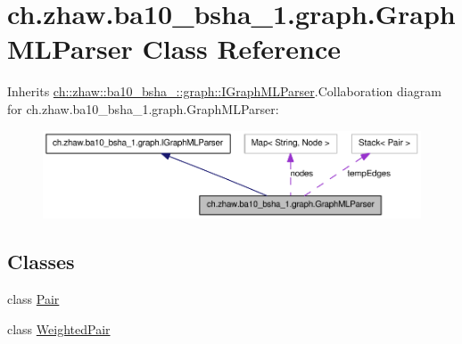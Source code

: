 \hypertarget{classch_1_1zhaw_1_1ba10__bsha__1_1_1graph_1_1GraphMLParser}{
\section{ch.zhaw.ba10\_\-bsha\_\-1.graph.GraphMLParser Class Reference}
\label{classch_1_1zhaw_1_1ba10__bsha__1_1_1graph_1_1GraphMLParser}
}


Inherits \hyperlink{interfacech_1_1zhaw_1_1ba10__bsha__1_1_1graph_1_1IGraphMLParser}{ch::zhaw::ba10\_\-bsha\_::graph::IGraphMLParser}.Collaboration diagram for ch.zhaw.ba10\_\-bsha\_\-1.graph.GraphMLParser:\nopagebreak
\begin{figure}[H]
\begin{center}
\leavevmode
\includegraphics[width=400pt]{classch_1_1zhaw_1_1ba10__bsha__1_1_1graph_1_1GraphMLParser__coll__graph}
\end{center}
\end{figure}
\subsection*{Classes}
\begin{DoxyCompactItemize}
\item 
class \hyperlink{classch_1_1zhaw_1_1ba10__bsha__1_1_1graph_1_1GraphMLParser_1_1Pair}{Pair}
\item 
class \hyperlink{classch_1_1zhaw_1_1ba10__bsha__1_1_1graph_1_1GraphMLParser_1_1WeightedPair}{WeightedPair}
\end{DoxyCompactItemize}
